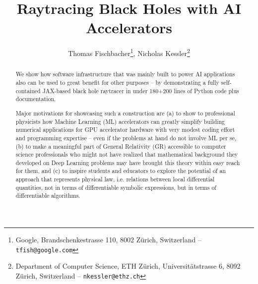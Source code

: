 \documentclass[twocolumn]{article}
\title{Raytracing Black Holes with AI Accelerators}
\author{Thomas Fischbacher\footnote{Google, Brandschenkestrasse
  110, 8002 Zürich, Switzerland -- \texttt{tfish@google.com}}, Nicholas Kessler\footnote{Department of Computer Science, ETH Z\"urich, Universit\"atstrasse 6, 8092 Z\"urich, Switzerland -- \texttt{nkessler@ethz.ch}}}
\date{}
\begin{document}
\onecolumn


\maketitle

\begin{abstract}
  We show how software infrastructure that was mainly built to
  power AI applications also can be used to great benefit for other
  purposes -- by demonstrating a fully self-contained JAX-based black
  hole raytracer in under 180+200 lines of Python code plus documentation.

  Major motivations for showcasing such a construction are (a) to show
  to professional physicists how Machine Learning (ML) accelerators
  can greatly simplify building numerical applications for GPU
  accelerator hardware with very modest coding effort and programming
  expertise -- even if the problems at hand do not involve ML per se,
  (b) to make a meaningful part of General Relativity (GR) accessible
  to computer science professionals who might not have realized that
  mathematical background they developed on Deep Learning problems may
  have brought this theory within easy reach for them, and (c) to
  inspire students and educators to explore the potential of an
  approach that represents physical law, i.e. relations between local
  differential quantities, not in terms of differentiable symbolic
  expressions, but in terms of differentiable algorithms.
\end{abstract}
\end{document}
